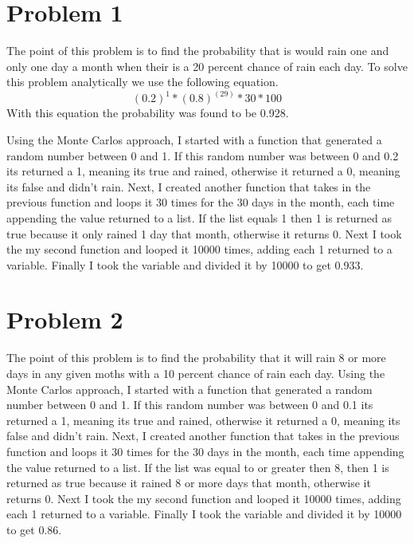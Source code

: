 \documentclass[twocolumn]{revtex4}
\begin{document}
\section{Problem 1}
The point of this problem is to find the probability that is would rain one and only one day a month when their is a 20 percent chance of rain each day. To solve this problem analytically we use the following equation. $$(0.2)^1*(0.8)^{(29)}*30*100$$
With this equation the probability was found to be 0.928.

Using the Monte Carlos approach, I started with a function that generated a random number between 0 and 1. If this random number was between 0 and 0.2 its returned a 1, meaning its true and rained, otherwise it returned a 0, meaning its false and didn't rain. Next, I created another function that takes in the previous function and loops it 30 times for the 30 days in the month, each time appending the value returned to a list. If the list equals 1 then 1 is returned as true because it only rained 1 day that month, otherwise it returns 0. Next I took the my second function and looped it 10000 times, adding each 1 returned to a variable. Finally I took the variable and divided it by 10000 to get 0.933.

 
\section{Problem 2}
The point of this problem is to find the probability that it will rain 8 or more days in any given moths with a 10 percent chance of rain each day. Using the Monte Carlos approach, I started with a function that generated a random number between 0 and 1. If this random number was between 0 and 0.1 its returned a 1, meaning its true and rained, otherwise it returned a 0, meaning its false and didn't rain. Next, I created another function that takes in the previous function and loops it 30 times for the 30 days in the month, each time appending the value returned to a list. If the list was equal to or greater then 8, then 1 is returned as true because it rained 8 or more days that month, otherwise it returns 0. Next I took the my second function and looped it 10000 times, adding each 1 returned to a variable. Finally I took the variable and divided it by 10000 to get 0.86. 
\end{document}
